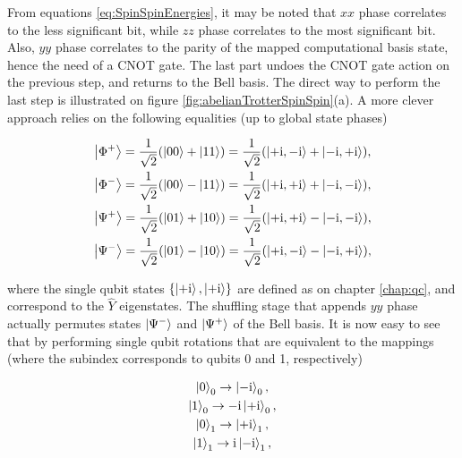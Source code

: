       From equations \ref{eq:SpinSpinEnergies}, it may be noted that $xx$ phase correlates to the less significant bit, while $zz$ phase correlates to the most significant bit. Also, $yy$ phase correlates to the parity of the mapped computational basis state, hence the need of a CNOT gate. The last part undoes the CNOT gate action on the previous step, and returns to the Bell basis. The direct way to perform the last step is illustrated on figure \ref{fig:abelianTrotterSpinSpin}(a). A more clever approach relies on the following equalities (up to global state phases)

      \begin{gather}
        \ket{\Phi^{+}} = \frac{1}{\sqrt{2}}(\ket{00} + \ket{11}) = \frac{1}{\sqrt{2}}(\ket{+\mathrm{i},-\mathrm{i}} + \ket{-\mathrm{i},+\mathrm{i}}), \\
        \ket{\Phi^{-}} = \frac{1}{\sqrt{2}}(\ket{00} - \ket{11}) = \frac{1}{\sqrt{2}}(\ket{+\mathrm{i},+\mathrm{i}} + \ket{-\mathrm{i},-\mathrm{i}}), \\
        \ket{\Psi^{+}} = \frac{1}{\sqrt{2}}(\ket{01} + \ket{10}) = \frac{1}{\sqrt{2}}(\ket{+\mathrm{i},+\mathrm{i}} - \ket{-\mathrm{i},-\mathrm{i}}), \\
        \ket{\Psi^{-}} = \frac{1}{\sqrt{2}}(\ket{01} - \ket{10}) = \frac{1}{\sqrt{2}}(\ket{+\mathrm{i},-\mathrm{i}} - \ket{-\mathrm{i},+\mathrm{i}}), 
        \label{eq:bellOnYBasis}
      \end{gather}

      \noindent where the single qubit states $\{\ket{+\mathrm{i}}, \ket{+\mathrm{i}}\}$ are defined as on chapter \ref{chap:qc}, and correspond to the $\hat{Y}$ eigenstates. The shuffling stage that appends $yy$ phase actually permutes states $\ket{\Psi^{-}}$ and $\ket{\Psi^{+}}$ of the Bell basis. It is now easy to see that by performing single qubit rotations that are equivalent to the mappings (where the subindex corresponds to qubits 0 and 1, respectively)

      \begin{gather}
        \ket{0}_0 \rightarrow \ket{-\mathrm{i}}_0, \\
        \ket{1}_0 \rightarrow -\mathrm{i}\ket{+\mathrm{i}}_0, \\
        \ket{0}_1 \rightarrow \ket{+\mathrm{i}}_1, \\
        \ket{1}_1 \rightarrow \mathrm{i}\ket{-\mathrm{i}}_1, \\
        \label{eq:localBellShuffling}
      \end{gather}

